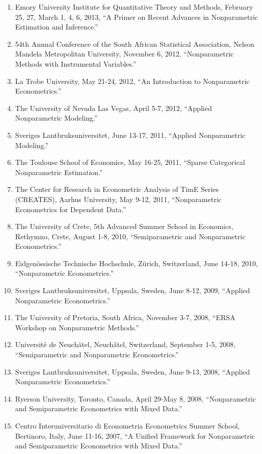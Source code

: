 \documentclass[
]{article}
\begin{document}
\begin{enumerate}
\item
  Emory University Institute for Quantitative Theory and Methods,
  February 25, 27, March 1, 4, 6, 2013, ``A Primer on Recent Advances in
  Nonparametric Estimation and Inference.''
\item
  54th Annual Conference of the South African Statistical Association,
  Nelson Mandela Metropolitan University, November 6, 2012,
  ``Nonparametric Methods with Instrumental Variables.''
\item
  La Trobe University, May 21-24, 2012, ``An Introduction to
  Nonparametric Econometrics.''
\item
  The University of Nevada Las Vegas, April 5-7, 2012, ``Applied
  Nonparametric Modeling.''
\item
  Sveriges Lantbruksuniversitet, June 13-17, 2011, ``Applied
  Nonparametric Modeling.''
\item
  The Toulouse School of Economics, May 16-25, 2011, ``Sparse
  Categorical Nonparametric Estimation.''
\item
  The Center for Research in Econometric Analysis of TimE Series
  (CREATES), Aarhus University, May 9-12, 2011, ``Nonparametric
  Econometrics for Dependent Data.''
\item
  The University of Crete, 5th Advanced Summer School in Economics,
  Rethymno, Crete, August 1-8, 2010, ``Semiparametric and Nonparametric
  Econometrics.''
\item
  Eidgenössische Technische Hochschule, Zürich, Switzerland, June 14-18,
  2010, ``Nonparametric Econometrics.''
\item
  Sveriges Lantbruksuniversitet, Uppsala, Sweden, June 8-12, 2009,
  ``Applied Nonparametric Econometrics.''
\item
  The University of Pretoria, South Africa, November 3-7, 2008, ``ERSA
  Workshop on Nonparametric Methods.''
\item
  Université de Neuchâtel, Neuchâtel, Switzerland, September 1-5, 2008,
  ``Semiparametric and Nonparametric Econometrics.''
\item
  Sveriges Lantbruksuniversitet, Uppsala, Sweden, June 9-13, 2008,
  ``Applied Nonparametric Econometrics.''
\item
  Ryerson University, Toronto, Canada, April 29-May 8, 2008,
  ``Nonparametric and Semiparametric Econometrics with Mixed Data.''
\item
  Centro Interuniversitario di Econometria Econometrics Summer School,
  Bertinoro, Italy, June 11-16, 2007, ``A Unified Framework for
  Nonparametric and Semiparametric Econometrics with Mixed Data.''
\end{enumerate}
\end{document}
